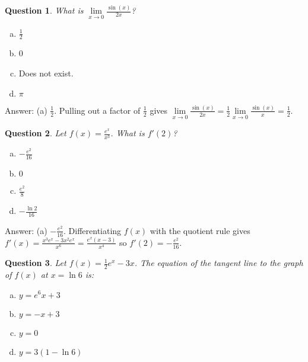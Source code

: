 \documentclass[10pt]{article}
\newtheorem{quiz}{Question}
\begin{document}
 \begin{multicols}{2}

\begin{quiz} What is $\lim\limits_{x\to 0} \frac{\sin (x)}{2x}$?
\end{quiz}
\begin {enumerate}[(a)]
\item $\frac{1}{2}$
\item 0
\item Does not exist.
\item $\pi$
\end{enumerate}
\vspace{0.5 cm}

Answer: (a) $\frac{1}{2}$. Pulling out a factor of $\frac{1}{2}$ gives $\lim\limits_{x\to 0} \frac{\sin (x)}{2x} = \frac{1}{2}\lim\limits_{x\to 0} \frac{\sin (x)}{x} = \frac{1}{2}$.

\vspace{5mm}

\begin{quiz} Let $f(x) = \frac{e^x}{x^3}$. What is $f'(2)$?
\end{quiz}
\begin {enumerate}[(a)]
\item $-\frac{e^2}{16}$
\item $0$
\item $\frac{e^2}{8}$
\item $-\frac{ \ln2}{16}$
\end{enumerate}
\vspace{0.5 cm}

Answer: (a) $-\frac{e^2}{16}$. Differentiating $f(x)$ with the quotient rule gives $f'(x) =\frac{x^3e^x - 3x^2e^x}{x^6} = \frac{e^x(x - 3)}{x^4}$ so $f'(2) = -\frac{e^2}{16}$.

\vfill
\columnbreak

\begin{quiz}Let $f(x) = \frac{1}{2} e^x - 3x$. The equation of the tangent line to the graph of $f(x)$ at $x = \ln 6$ is:
\end{quiz}
\begin {enumerate}[(a)]
\item $y= e^6 x + 3$
\item $y = -x + 3$
\item $y = 0$
\item $y = 3(1-\ln 6)$
\end{enumerate}

\vspace{5mm}


\end{multicols}
\end{document}
